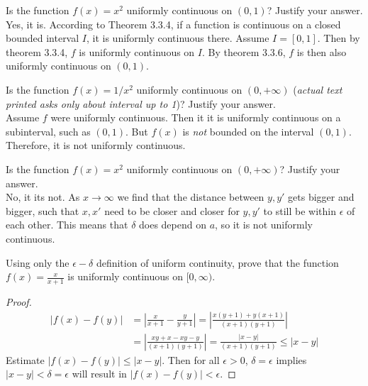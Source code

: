 \documentclass[12pt]{book}
\newenvironment{exercise}[2][Exercise]{\begin{trivlist}
\item[\hskip \labelsep {\bfseries #1}\hskip \labelsep {\bfseries #2.}]}{\end{trivlist}}
\begin{document}
\begin{exercise}{1.4.6}
\begin{exercise}{3.3.1}
Is the function $f(x)=x^2$ uniformly continuous on $(0,1)$? Justify your answer. \\

Yes, it is. According to Theorem 3.3.4, if a function is continuous on a closed bounded interval $I$, it is uniformly continuous there. Assume $I=[0,1]$. Then by theorem 3.3.4, $f$ is uniformly continuous on $I$. By theorem 3.3.6, $f$ is then also uniformly continuous on $(0,1)$.
\end{exercise}


\begin{exercise}{3.3.2}
    Is the function $f(x)=1/x^2$ uniformly continuous on $(0,+\infty)$ (\emph{actual text printed asks only about interval up to 1})? Justify your answer. \\
    
    Assume $f$ were uniformly continuous. Then it it is uniformly continuous on a subinterval, such as $(0,1)$. But $f(x)$ is \emph{not} bounded on the interval $(0,1)$. Therefore, it is not uniformly continuous. 
\end{exercise}


\begin{exercise}{3.3.3}
Is the function $f(x) = x^2$ uniformly continuous on $(0, + \infty)$? Justify your answer.  \\

No, it its not. As $x \to \infty$ we find that the distance between $y,y'$ gets bigger and bigger, such that $x,x'$ need to be closer and closer for $y,y'$ to still be within $\epsilon$ of each other. This means that $\delta$ does depend on $a$, so it is not uniformly continuous. 
\end{exercise}


\begin{exercise}{3.3.4}
    Using only the $\epsilon-\delta$ definition of uniform continuity, prove that the function $f(x)=\frac{x}{x+1}$ is uniformly continuous on $[0,\infty)$.
    
    \begin{proof}
        \begin{align*}
        |f(x)-f(y)| &= | \frac{x}{x+1} - \frac{y}{y+1} | = |\frac{x(y+1) + y(x+1)}{(x+1)(y+1)}| \\
         &= |\frac{xy+x-xy-y}{(x+1)(y+1)}| = \frac{|x-y|}{(x+1)(y+1)} \leq |x-y|
         \end{align*}
    Estimate $|f(x)-f(y)|\leq |x-y|$. Then for all $\epsilon> 0$, $\delta = \epsilon$ implies $|x-y|<\delta = \epsilon$ will result in $|f(x)-f(y)|<\epsilon$.
    \end{proof}
\end{exercise}




\end{exercise}
\end{document}
